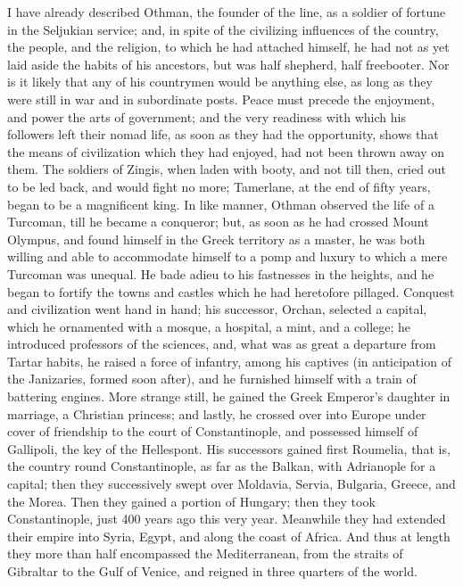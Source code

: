 I have already described
Othman, the founder of the line, as a soldier of fortune in the
Seljukian service; and, in spite of the civilizing influences of the
country, the people, and the religion, to which he had attached
himself, he had not as yet laid aside the habits of his ancestors, but
was half shepherd, half freebooter. Nor is it likely that any of his
countrymen would be anything else, as long as they were still in war
and in subordinate posts. Peace must precede the enjoyment, and power
the arts of government; and the very readiness with which his
followers left their nomad life, as soon as they had the opportunity,
shows that the means of civilization which they had enjoyed, had not
been thrown away on them. The soldiers of Zingis, when laden with
booty, and not till then, cried out to be led back, and would fight no
more; Tamerlane, at the end of fifty years, began to be a magnificent
king. In like manner, Othman observed the life of a Turcoman, till he
became a conqueror; but, as soon as he had crossed Mount Olympus, and
found himself in the Greek territory as a master, he was both willing
and able to accommodate himself to a pomp and luxury to which a mere
Turcoman was unequal. He bade adieu to his fastnesses in the heights,
and he began to fortify the towns and castles which he had heretofore
pillaged. Conquest and civilization went hand in hand; his successor,
Orchan, selected a capital, which he ornamented with a mosque, a
hospital, a mint, and a college; he introduced professors of the
sciences, and, what was as great a departure from Tartar habits, he
raised a force of infantry, among his captives (in anticipation of the
Janizaries, formed soon after), and he furnished himself with a train
of battering engines. More strange still, he gained the Greek Emperor's
daughter in marriage, a Christian princess; and lastly, he crossed
over into Europe under cover of friendship to the court of
Constantinople, and possessed himself of Gallipoli, the key of the
Hellespont. His successors gained first Roumelia, that is, the country
round Constantinople, as far as the Balkan, with Adrianople for a
capital; then they successively swept over Moldavia, Servia, Bulgaria,
Greece, and the Morea. Then they gained a portion of Hungary; then
they took Constantinople, just 400 years ago this very year. Meanwhile
they had extended their empire into Syria, Egypt, and along the coast
of Africa. And thus at length they more than half encompassed the
Mediterranean, from the straits of Gibraltar to the Gulf of Venice,
and reigned in three quarters of the world.

